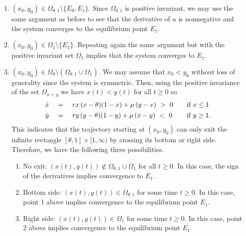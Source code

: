 \begin{enumerate}
 \item $(x_0, y_0) \in \Omega_{\theta, 1} \setminus \{E_{\theta}, E_1 \}$.
  Since $\Omega_{\theta, 1}$ is positive invariant, we may use the same argument as before to see that the derivative of $u$ is
  nonnegative and the system converges to the equilibrium point $E_1$. \vspace{4pt}
 \item $(x_0, y_0) \in \Omega_1 \setminus \{E_1 \}$.
  Repeating again the same argument but with the positive invariant set $\Omega_1$ implies that the system converges to $E_1$. \vspace{4pt}
 \item $(x_0, y_0) \in \Omega_{\theta} \setminus (\Omega_{\theta, 1} \cup \Omega_1)$.
  We may assume that $x_0 < y_0$ without loss of generality since the system is symmetric.
  Then, using the positive invariance of the set $\Omega_{x < y}$ we have $x (t) < y (t)$ for all $t \geq 0$ so
  $$ \begin{array}{rcll}
     \dot{x} \ & = & \ r x \,(x - \theta) (1 - x) + \mu \,(y - x) \ > \ 0 & \quad \hbox{if} \ x \leq 1 \vspace{4pt} \\
     \dot{y} \ & = & \ r y \,(y - \theta) (1 - y) + \mu \,(x - y) \ < \ 0 & \quad \hbox{if} \ y \geq 1. \end{array} $$
  This indicates that the trajectory starting at $(x_0, y_0)$ can only exit the infinite rectangle $[\theta, 1] \times [1, \infty)$ by crossing
  its bottom or right side.
  Therefore, we have the following three possibilities. \vspace{4pt}
 \begin{enumerate}
  \item[a.] No exit: $(x (t), y (t)) \notin \Omega_{\theta, 1} \cup \Omega_1$ for all $t \geq 0$.
   In this case, the sign of the derivatives implies convergence to $E_1$. \vspace{4pt}
  \item[b.] Bottom side: $(x (t), y (t)) \in \Omega_{\theta, 1}$ for some time $t \geq 0$.
   In this case, point 1 above implies convergence to the equilibrium point $E_1$. \vspace{4pt}
  \item[b.] Right side: $(x (t), y (t)) \in \Omega_1$ for some time $t \geq 0$.
   In this case, point 2 above implies convergence to the equilibrium point $E_1$.
 \end{enumerate}
\end{enumerate}
